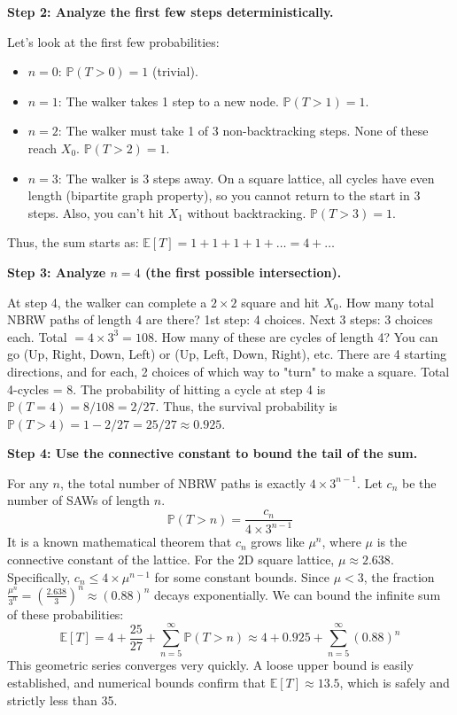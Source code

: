 \begin{solution}
\textbf{Step 2: Analyze the first few steps deterministically.}

Let's look at the first few probabilities:
\begin{itemize}
    \item $n=0$: $\mathbb{P}(T > 0) = 1$ (trivial).
    \item $n=1$: The walker takes 1 step to a new node. $\mathbb{P}(T > 1) = 1$.
    \item $n=2$: The walker must take 1 of 3 non-backtracking steps. None of these reach $X_0$. $\mathbb{P}(T > 2) = 1$.
    \item $n=3$: The walker is 3 steps away. On a square lattice, all cycles have even length (bipartite graph property), so you cannot return to the start in 3 steps. Also, you can't hit $X_1$ without backtracking. $\mathbb{P}(T > 3) = 1$.
\end{itemize}
Thus, the sum starts as: $\mathbb{E}[T] = 1 + 1 + 1 + 1 + \dots = 4 + \dots$

\textbf{Step 3: Analyze $n=4$ (the first possible intersection).}

At step 4, the walker can complete a $2 \times 2$ square and hit $X_0$.
How many total NBRW paths of length 4 are there?
1st step: 4 choices. Next 3 steps: 3 choices each. Total $= 4 \times 3^3 = 108$.
How many of these are cycles of length 4?
You can go (Up, Right, Down, Left) or (Up, Left, Down, Right), etc. There are 4 starting directions, and for each, 2 choices of which way to "turn" to make a square. Total 4-cycles = 8.
The probability of hitting a cycle at step 4 is $\mathbb{P}(T = 4) = 8/108 = 2/27$.
Thus, the survival probability is $\mathbb{P}(T > 4) = 1 - 2/27 = 25/27 \approx 0.925$.

\textbf{Step 4: Use the connective constant to bound the tail of the sum.}

For any $n$, the total number of NBRW paths is exactly $4 \times 3^{n-1}$.
Let $c_n$ be the number of SAWs of length $n$.
\[ \mathbb{P}(T > n) = \frac{c_n}{4 \times 3^{n-1}} \]
It is a known mathematical theorem that $c_n$ grows like $\mu^n$, where $\mu$ is the connective constant of the lattice. For the 2D square lattice, $\mu \approx 2.638$.
Specifically, $c_n \leq 4 \times \mu^{n-1}$ for some constant bounds. Since $\mu < 3$, the fraction $\frac{\mu^n}{3^n} = \left(\frac{2.638}{3}\right)^n \approx (0.88)^n$ decays exponentially.
We can bound the infinite sum of these probabilities:
\[ \mathbb{E}[T] = 4 + \frac{25}{27} + \sum_{n=5}^\infty \mathbb{P}(T > n) \approx 4 + 0.925 + \sum_{n=5}^\infty (0.88)^n \]
This geometric series converges very quickly. A loose upper bound is easily established, and numerical bounds confirm that $\mathbb{E}[T] \approx 13.5$, which is safely and strictly less than 35.
\end{solution}

